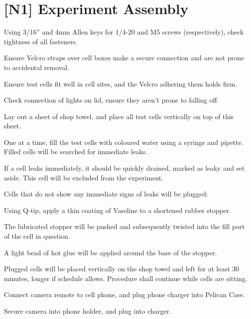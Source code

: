 \newpage
\section{[N1] Experiment Assembly}
\begin{checklist}
    \item Using 3/16'' and 4mm Allen keys for 1/4-20 and M5 screws (respectively), check tightness of all fasteners. 
    \item Ensure Velcro straps over cell boxes make a secure connection and are not prone to accidental removal.
    \item Ensure test cells fit well in cell sites, and the Velcro adhering them holds firm. 
    \item Check connection of lights on lid, ensure they aren’t prone to falling off. 
    \item Lay out a sheet of shop towel, and place all test cells vertically on top of this sheet.
    \item One at a time, fill the test cells with coloured water using a syringe and pipette. Filled cells will be searched for immediate leaks.
    \begin{checklist}
        \item If a cell leaks immediately, it should be quickly drained, marked as leaky and set aside. This cell will be excluded from the experiment. 
        \item Cells that do not show any immediate signs of leaks will be plugged:
        \begin{checklist}
            \item Using Q-tip, apply a thin coating of Vaseline to a shortened rubber stopper.
            \item The lubricated stopper will be pushed and subsequently twisted into the 
fill port of the cell in question.
            \item A light bead of hot glue will be applied around the base of the stopper.
        \end{checklist}
        \item Plugged cells will be placed vertically on the shop towel and left for at least 30 minutes, longer if schedule allows.  Procedure shall continue while cells are sitting.
    \end{checklist}
    \item Connect camera remote to cell phone, and plug phone charger into Pelican Case.
    \item Secure camera into phone holder, and plug into charger.

\end{checklist}
